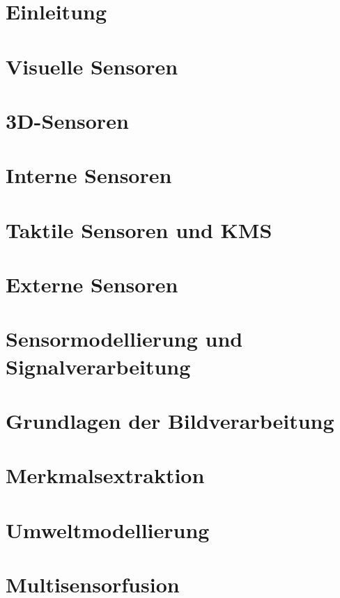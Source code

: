 \documentclass[11pt]{scrartcl}
\begin{document}
\section{Einleitung} %


\section{Visuelle Sensoren} %


\section{3D-Sensoren}


\section{Interne Sensoren}


\section{Taktile Sensoren und KMS}


\section{Externe Sensoren}


\section{Sensormodellierung und Signalverarbeitung}


\section{Grundlagen der Bildverarbeitung}


\section{Merkmalsextraktion}


\section{Umweltmodellierung}


\section{Multisensorfusion}

\end{document}
